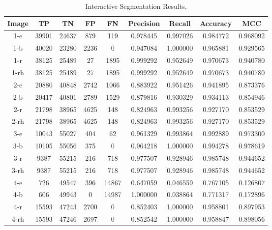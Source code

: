 \clearpage
\begin{longtable}[!h]{|c|c|c|c|c|c|c|c|c|}
	\caption{Interactive Segmentation Results.} \label{tab:interactiveresults}\\
	\hline	Image	&	TP	&	TN	&	FP	&	FN	&	Precision	&	Recall	&	Accuracy	&	MCC	\\
	\hline \rowcolor{closest} 1-e	&	39901	&	24637	&	879	&	119	&	0.978445	&	0.997026	&	0.984772	&	0.968092	\\
	\hline \rowcolor{bad}	1-b	&	40020	&	23280	&	2236	&	0	&	0.947084	&	1.000000	&	0.965881	&	0.929565	\\
	\hline	1-r	&	38125	&	25489	&	27	&	1895	&	0.999292	&	0.952649	&	0.970673	&	0.940780	\\
	\hline	1-rh	&	38125	&	25489	&	27	&	1895	&	0.999292	&	0.952649	&	0.970673	&	0.940780	\\
	
	\hline \rowcolor{closest} 2-e	&	20880	&	40848	&	2742	&	1066	&	0.883922	&	0.951426	&	0.941895	&	0.873376	\\
	\hline	2-b	&	20417	&	40801	&	2789	&	1529	&	0.879816	&	0.930329	&	0.934113	&	0.854946	\\
	\hline \rowcolor{bad}	2-r	&	21798	&	38965	&	4625	&	148	&	0.824963	&	0.993256	&	0.927170	&	0.853529	\\
	\hline \rowcolor{bad}	2-rh	&	21798	&	38965	&	4625	&	148	&	0.824963	&	0.993256	&	0.927170	&	0.853529	\\
	
	\hline	3-e	&	10043	&	55027	&	404	&	62	&	0.961329	&	0.993864	&	0.992889	&	0.973300	\\
	\hline \rowcolor{closest}	3-b	&	10105	&	55056	&	375	&	0	&	0.964218	&	1.000000	&	0.994278	&	0.978619	\\
	\hline \rowcolor{bad}	3-r	&	9387	&	55215	&	216	&	718	&	0.977507	&	0.928946	&	0.985748	&	0.944652	\\
	\hline \rowcolor{bad}	3-rh	&	9387	&	55215	&	216	&	718	&	0.977507	&	0.928946	&	0.985748	&	0.944652	\\
	
	\hline \rowcolor{bad}	4-e	&	726	&	49547	&	396	&	14867	&	0.647059	&	0.046559	&	0.767105	&	0.126807	\\
	\hline	4-b	&	606	&	49943	&	0	&	14987	&	1.000000	&	0.038864	&	0.771317	&	0.172896	\\
	\hline	4-r	&	15593	&	47243	&	2700	&	0	&	0.852403	&	1.000000	&	0.958801	&	0.897953	\\
	\hline \rowcolor{closest}	4-rh	&	15593	&	47246	&	2697	&	0	&	0.852542	&	1.000000	&	0.958847	&	0.898056	\\
	

\end{longtable}
